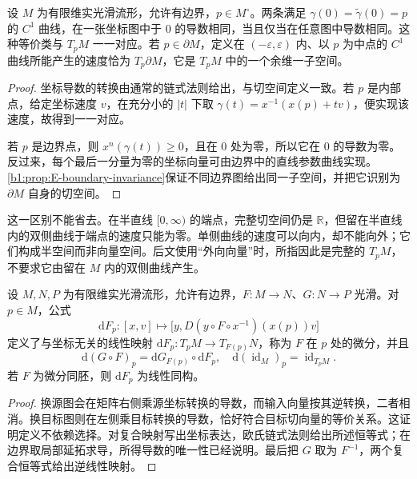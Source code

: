 \begin{proposition}[曲线给出的切向量]\label{b1:prop:E-tangent-curves}
设 \(M\) 为有限维实光滑流形，允许有边界，\(p\in M^\circ\)。两条满足 \(\gamma(0)=\widetilde\gamma(0)=p\) 的 \(C^1\) 曲线，在一张坐标图中于 \(0\) 的导数相同，当且仅当在任意图中导数相同。这种等价类与 \(T_pM\) 一一对应。若 \(p\in\partial M\)，定义在 \((-\varepsilon,\varepsilon)\) 内、以 \(p\) 为中点的 \(C^1\) 曲线所能产生的速度恰为 \(T_p\partial M\)，它是 \(T_pM\) 中的一个余维一子空间。
\end{proposition}
\begin{proof}
坐标导数的转换由通常的链式法则给出，与切空间定义一致。若 \(p\) 是内部点，给定坐标速度 \(v\)，在充分小的 \(|t|\) 下取 \(\gamma(t)=x^{-1}(x(p)+tv)\)，便实现该速度，故得到一一对应。

若 \(p\) 是边界点，则 \(x^n(\gamma(t))\geq0\)，且在 \(0\) 处为零，所以它在 \(0\) 的导数为零。反过来，每个最后一分量为零的坐标向量可由边界中的直线参数曲线实现。\cref{b1:prop:E-boundary-invariance}保证不同边界图给出同一子空间，并把它识别为 \(\partial M\) 自身的切空间。
\end{proof}

这一区别不能省去。在半直线 \([0,\infty)\) 的端点，完整切空间仍是 \(\mathbb R\)，但留在半直线内的双侧曲线于端点的速度只能为零。单侧曲线的速度可以向内，却不能向外；它们构成半空间而非向量空间。后文使用“外向向量”时，所指因此是完整的 \(T_pM\)，不要求它由留在 \(M\) 内的双侧曲线产生。

\begin{proposition}[微分与链式法则]\label{b1:prop:E-differential-chain}
设 \(M,N,P\) 为有限维实光滑流形，允许有边界，\(F:M\rightarrow N\)、\(G:N\rightarrow P\) 光滑。对 \(p\in M\)，公式
\[
 \mathrm{d}F_p:[x,v]\longmapsto
 \bigl[y,D(y\circ F\circ x^{-1})(x(p))v\bigr]
\]
定义了与坐标无关的线性映射 \(\mathrm{d}F_p:T_pM\rightarrow T_{F(p)}N\)，称为 \(F\) 在 \(p\) 处的微分，并且
\[
 \mathrm{d}(G\circ F)_p
 =\mathrm{d}G_{F(p)}\circ\mathrm{d}F_p,
 \quad \mathrm{d}(\operatorname{id}_M)_p=\operatorname{id}_{T_pM}.
\]
若 \(F\) 为微分同胚，则 \(\mathrm{d}F_p\) 为线性同构。
\end{proposition}
\begin{proof}
换源图会在矩阵右侧乘源坐标转换的导数，而输入向量按其逆转换，二者相消。换目标图则在左侧乘目标转换的导数，恰好符合目标切向量的等价关系。这证明定义不依赖选择。对复合映射写出坐标表达，欧氏链式法则给出所述恒等式；在边界取局部延拓求导，所得导数的唯一性已经说明。最后把 \(G\) 取为 \(F^{-1}\)，两个复合恒等式给出逆线性映射。
\end{proof}

